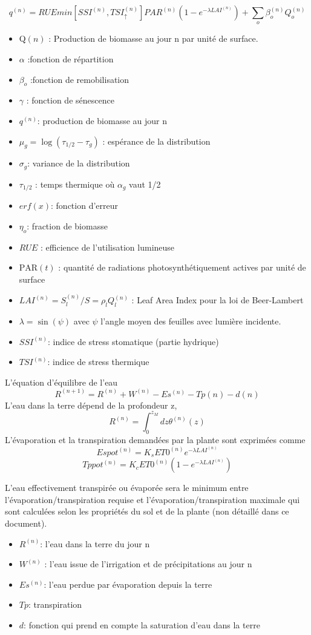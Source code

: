\[ {q^{(n)}}=RUE min[SSI^{(n)}, TSI_\uparrow^{(n)}]PAR^{(n)}(1-e^{-\lambda LAI^{(n)}})+\sum_o \beta_o^{(n)}Q_o^{(n)} \]
\begin{itemize}
\item $\mathrm{Q}(n)$ : Production de biomasse au jour n par unité de surface.
\item $\alpha$  :fonction de répartition
\item $\beta_o$  :fonction de remobilisation
\item $\gamma$ : fonction de sénescence
\item $q^{(n)}$: production de biomasse au jour n 
\item $\mu_g=\log (\tau_{1/2}-\tau_g)$ : espérance de la distribution
\item $\sigma_g$: variance de la distribution
\item $\tau_{1/2}$ : temps thermique où $\alpha_g$ vaut 1/2
\item $erf(x)$: fonction d'erreur
\item $\eta_o$: fraction de biomasse 
\item $RUE$ : efficience de l'utilisation lumineuse
\item $\mathrm{PAR}(t)$ : quantité de radiations photosynthétiquement actives par unité de surface
\item $LAI^{(n)} = S^{(n)}_l/S = \rho_l Q^{(n)}_l $ : Leaf Area Index pour la loi de Beer-Lambert 
\item $\lambda = \sin(\psi)$ avec $\psi$ l'angle moyen des feuilles avec lumière incidente. 
\item $SSI^{(n)}$: indice de stress stomatique (partie hydrique)
\item $TSI^{(n)}$: indice de stress thermique
\end{itemize}
L'équation d'équilibre de l'eau
\[ {R^{(n+1)}}=R^{(n)}+W^{(n)}-Es^{(n)}-Tp{(n)}-d{(n)}\]
L'eau dans la terre dépend de la profondeur z,
\[ {R^{(n)}}=\int_0^{z_M}dz \theta^{(n)}(z) \]
L'évaporation et la transpiration demandées par la plante sont exprimées comme
\[ {Espot^{(n)}}=K_sET0^{(n)}e^{-\lambda LAI^{(n)}}\]
\[ {Tppot^{(n)}}=K_cET0^{(n)}(1-e^{-\lambda LAI^{(n)}})\]

L'eau effectivement transpirée ou évaporée sera le minimum  entre l'évaporation/transpiration requise et l'évaporation/transpiration maximale qui sont calculées selon les propriétés du sol et de la plante (non détaillé dans ce document).

\begin{itemize}
\item $R^{(n)}$: l'eau dans la terre du jour n
\item $W^{(n)}$ : l'eau issue de l'irrigation et de  précipitations au jour n
\item $Es^{(n)}$: l'eau perdue par évaporation depuis la terre
\item $Tp$: transpiration
\item $d$: fonction qui prend en compte la saturation d'eau dans la terre
\end{itemize}
